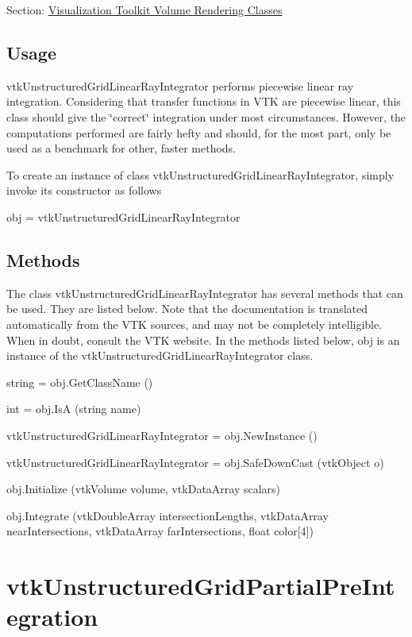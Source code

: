 Section\-: \hyperlink{sec_vtkvolumerendering}{Visualization Toolkit Volume Rendering Classes} \hypertarget{vtkwidgets_vtkxyplotwidget_Usage}{}\subsection{Usage}\label{vtkwidgets_vtkxyplotwidget_Usage}
vtk\-Unstructured\-Grid\-Linear\-Ray\-Integrator performs piecewise linear ray integration. Considering that transfer functions in V\-T\-K are piecewise linear, this class should give the \char`\"{}correct\char`\"{} integration under most circumstances. However, the computations performed are fairly hefty and should, for the most part, only be used as a benchmark for other, faster methods.

To create an instance of class vtk\-Unstructured\-Grid\-Linear\-Ray\-Integrator, simply invoke its constructor as follows \begin{DoxyVerb}  obj = vtkUnstructuredGridLinearRayIntegrator
\end{DoxyVerb}
 \hypertarget{vtkwidgets_vtkxyplotwidget_Methods}{}\subsection{Methods}\label{vtkwidgets_vtkxyplotwidget_Methods}
The class vtk\-Unstructured\-Grid\-Linear\-Ray\-Integrator has several methods that can be used. They are listed below. Note that the documentation is translated automatically from the V\-T\-K sources, and may not be completely intelligible. When in doubt, consult the V\-T\-K website. In the methods listed below, {\ttfamily obj} is an instance of the vtk\-Unstructured\-Grid\-Linear\-Ray\-Integrator class. 
\begin{DoxyItemize}
\item {\ttfamily string = obj.\-Get\-Class\-Name ()}  
\item {\ttfamily int = obj.\-Is\-A (string name)}  
\item {\ttfamily vtk\-Unstructured\-Grid\-Linear\-Ray\-Integrator = obj.\-New\-Instance ()}  
\item {\ttfamily vtk\-Unstructured\-Grid\-Linear\-Ray\-Integrator = obj.\-Safe\-Down\-Cast (vtk\-Object o)}  
\item {\ttfamily obj.\-Initialize (vtk\-Volume volume, vtk\-Data\-Array scalars)}  
\item {\ttfamily obj.\-Integrate (vtk\-Double\-Array intersection\-Lengths, vtk\-Data\-Array near\-Intersections, vtk\-Data\-Array far\-Intersections, float color\mbox{[}4\mbox{]})}  
\end{DoxyItemize}\hypertarget{vtkvolumerendering_vtkunstructuredgridpartialpreintegration}{}\section{vtk\-Unstructured\-Grid\-Partial\-Pre\-Integration}\label{vtkvolumerendering_vtkunstructuredgridpartialpreintegration}
